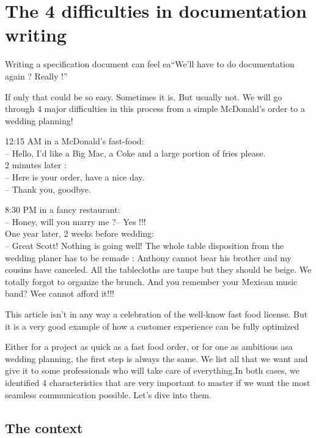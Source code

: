 \setchapterpreamble[u]{\margintoc}
\chapter{The 4 difficulties in documentation writing}
\label{sec:WhyBoring}

Writing a specification document can feel ea“We’ll have to do documentation again ? Really !”

If only that could be so easy. Sometimes it is. But usually not. We will go through 4 major difficulties in this process from a simple McDonald’s order to a wedding planning! 

12:15 AM in a McDonald’s fast-food:\\
– Hello, I’d like a Big Mac, a Coke and a large portion of fries please.\\
2 minutes later :\\
– Here is your order, have a nice day.\\
– Thank you, goodbye.

8:30 PM in a fancy restaurant:\\
– Honey, will you marry me ?– Yes !!!\\
One year later, 2 weeks before wedding:\\
– Great Scott! Nothing is going well! The whole table disposition from the wedding planer has to be remade : Anthony cannot bear his brother and my cousins have canceled. All the tablecloths are taupe but they should be beige. We totally forgot to organize the brunch. And you remember your Mexican music band? Wee cannot afford it!!!

\begin{kaobox}[frametitle=Disclaimer]
	This article isn’t in any way a celebration of the well-know fast food license. But it is a very good example of how a customer experience can be fully optimized
\end{kaobox}

Either for a project as quick as a fast food order, or for one as ambitious asa wedding planning, the first step is always the same. We list all that we want and give it to some professionals who will take care of everything.In both cases, we identified 4 characteristics that are very important to master if we want the most seamless communication possible. Let’s dive into them.


\section{The context}

